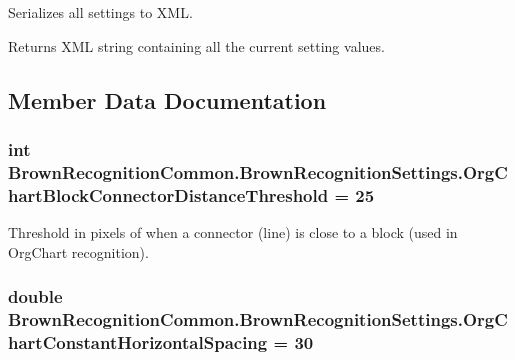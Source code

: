 \-Serializes all settings to \-X\-M\-L. 

\begin{DoxyReturn}{\-Returns}
\-X\-M\-L string containing all the current setting values.
\end{DoxyReturn}


\subsection{\-Member \-Data \-Documentation}
\hypertarget{class_brown_recognition_common_1_1_brown_recognition_settings_afb1494bf5bc116f8ae985c4505363610}{
\subsubsection[{\-Org\-Chart\-Block\-Connector\-Distance\-Threshold}]{\setlength{\rightskip}{0pt plus 5cm}int {\bf \-Brown\-Recognition\-Common.\-Brown\-Recognition\-Settings.\-Org\-Chart\-Block\-Connector\-Distance\-Threshold} = 25}}
\label{class_brown_recognition_common_1_1_brown_recognition_settings_afb1494bf5bc116f8ae985c4505363610}


\-Threshold in pixels of when a connector (line) is close to a block (used in \-Org\-Chart recognition). 

\hypertarget{class_brown_recognition_common_1_1_brown_recognition_settings_ac6a25e18980dbe6b3317e7402b716e73}{
\subsubsection[{\-Org\-Chart\-Constant\-Horizontal\-Spacing}]{\setlength{\rightskip}{0pt plus 5cm}double {\bf \-Brown\-Recognition\-Common.\-Brown\-Recognition\-Settings.\-Org\-Chart\-Constant\-Horizontal\-Spacing} = 30}}
\label{class_brown_recognition_common_1_1_brown_recognition_settings_ac6a25e18980dbe6b3317e7402b716e73}


